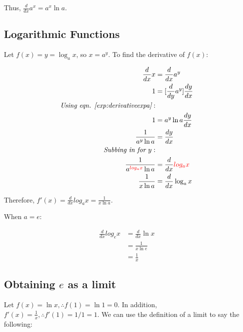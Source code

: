 \documentclass[12pt]{article}
\begin{document}
Thus, $\frac{d}{dx} a^x = a^x \ln a$.

\subsection{Logarithmic Functions}

Let $f(x) = y = \log_a{x}$, so $x = a^y$. To find the derivative of $f(x)$:

\begin{equation}
    \begin{split}
        \frac{d}{dx} x &= \frac{d}{dx} a^y\\
        1 &= [\frac{d}{dy} a^y] \frac{dy}{dx}\\
        \textit{Using eqn. \ref{exp:derivativeexpa}}:\\
        1 &= a^y \ln a \frac{dy}{dx}\\
        \frac{1}{a^y \ln a} &= \frac{dy}{dx}\\
        \textit{Subbing in for $y$}:\\
        \frac{1}{a^{\textcolor{red}{log_a{x}}} \ln a} &= \frac{d}{dx} \textcolor{red}{log_a{x}}\\
        \frac{1}{x \ln a} &= \frac{d}{dx} \log_a{x}
    \end{split}
\end{equation}

Therefore, $f'(x) = \frac{d}{dx} log_a{x} = \frac{1}{x \ln a}$.

When $a = e$:

\begin{equation}
    \begin{split}
        \frac{d}{dx} log_e{x} &= \frac{d}{dx} \ln x\\
        &= \frac{1}{x \ln e} \\
        &= \frac{1}{x}
    \end{split}
\end{equation}

\subsection{Obtaining \texorpdfstring{$e$}{TEXT} as a limit}

Let $f(x) = \ln x, \therefore f(1) = \ln 1 = 0$. In addition, $f'(x) = \frac{1}{x}, \therefore f'(1) = 1/1 = 1$. We can use the definition of a limit to say the following:
\end{document}

